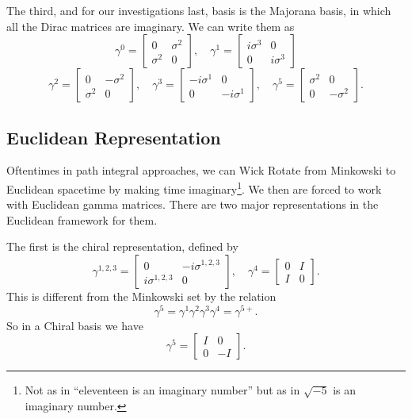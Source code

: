 The third, and for our investigations last, basis is the Majorana basis, in which all the Dirac matrices are imaginary. We can write them as
\begin{equation*}
\gamma^0 = \begin{bmatrix} 0 & \sigma^2 \\ \sigma^2 & 0 \end{bmatrix}, \quad \gamma^1 = \begin{bmatrix} i\sigma^3 & 0 \\ 0 & i\sigma^3 \end{bmatrix}
\end{equation*}
\begin{equation}
\gamma^2 = \begin{bmatrix} 0 & -\sigma^2 \\ \sigma^2 & 0 \end{bmatrix}, \quad \gamma^3 = \begin{bmatrix} -i\sigma^1 & 0 \\ 0 & -i\sigma^1 \end{bmatrix}, \quad \gamma^5 = \begin{bmatrix} \sigma^2 & 0 \\ 0 & -\sigma^2 \end{bmatrix}.
\end{equation}

\subsection{Euclidean Representation}

Oftentimes in path integral approaches, we can Wick Rotate from Minkowski to Euclidean spacetime by making time imaginary\footnote{Not as in ``eleventeen is an imaginary number'' but as in $\sqrt{-5}$ is an imaginary number.}. We then are forced to work with Euclidean gamma matrices. There are two major representations in the Euclidean framework for them.

The first is the chiral representation, defined by
\begin{equation}
\gamma^{1,2,3} = \begin{bmatrix} 0 & -i \sigma^{1,2,3} \\ i \sigma^{1,2,3} & 0 \end{bmatrix}, \quad \gamma^4=\begin{bmatrix} 0 & I \\ I & 0 \end{bmatrix}.
\end{equation}
This is different from the Minkowski set by the relation
\begin{equation}
\gamma^{5} = \gamma^1\gamma^2\gamma^3\gamma^4 = \gamma^{5+}.
\end{equation}
So in a Chiral basis we have
\begin{equation}
\gamma^5 = \begin{bmatrix} I & 0 \\ 0 & -I \end{bmatrix} .
\end{equation}

